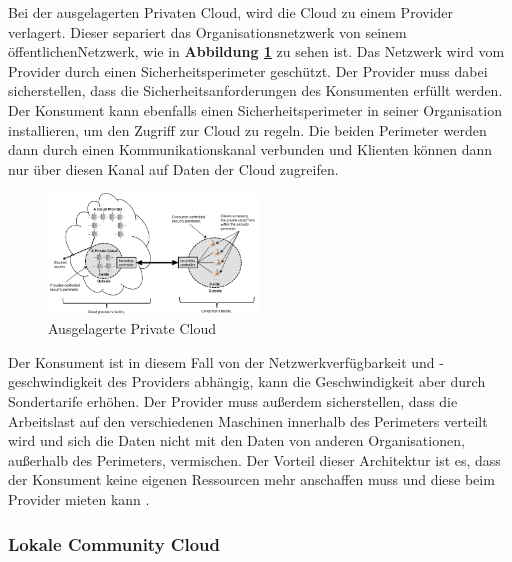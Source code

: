 Bei der ausgelagerten Privaten Cloud, wird die Cloud zu einem Provider verlagert. Dieser separiert das Organisationsnetzwerk
von seinem \glqq öffentlichen\grqq{}Netzwerk, wie in \textbf{Abbildung \ref{OutSourcedPrivateCloud}} zu sehen ist. Das Netzwerk wird vom Provider
durch einen Sicherheitsperimeter geschützt. Der Provider muss dabei sicherstellen, dass die Sicherheitsanforderungen des Konsumenten erfüllt werden. 
Der Konsument kann ebenfalls einen Sicherheitsperimeter in seiner Organisation installieren, um den Zugriff zur Cloud zu regeln.
Die beiden Perimeter werden dann durch einen Kommunikationskanal verbunden und Klienten können dann nur über diesen Kanal auf Daten der Cloud zugreifen.
\begin{figure}[h]
    \centering
	\includegraphics[width=0.5\textwidth]{Images/OutSourcedPrivateCloud}
	\caption{Ausgelagerte Private Cloud \cite{Badger}}
	\label{OutSourcedPrivateCloud}
\end{figure}
Der Konsument ist in diesem Fall von der Netzwerkverfügbarkeit und -geschwindigkeit des Providers abhängig, kann die Geschwindigkeit aber durch Sondertarife erhöhen.
Der Provider muss außerdem sicherstellen, dass die Arbeitslast auf den verschiedenen Maschinen innerhalb des Perimeters verteilt wird und sich die Daten 
nicht mit den Daten von anderen Organisationen, außerhalb des Perimeters, vermischen.
Der Vorteil dieser Architektur ist es, dass der Konsument keine eigenen Ressourcen mehr anschaffen muss und diese beim Provider mieten kann \cite{Badger}.

\subsubsection{Lokale Community Cloud}

